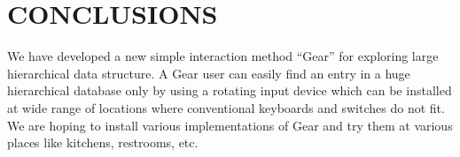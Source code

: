 \documentclass{article}
\begin{document}
\section*{CONCLUSIONS}

We have developed a new simple interaction method ``Gear'' for exploring
large hierarchical data structure.
A Gear user can easily find an entry in a huge hierarchical database
only by using a rotating input device which can be installed at
wide range of locations where conventional keyboards and switches do not fit.
We are hoping to install various implementations of Gear and try them at
various places like kitchens, restrooms, etc.

\small{


}
\end{document}
